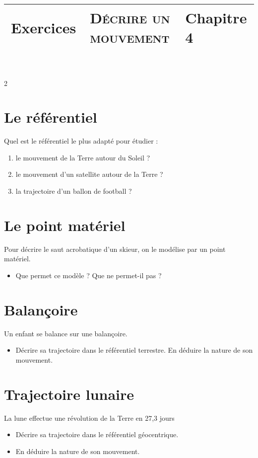 \documentclass[a4paper,11pt,fleqn]{article}%
\title{\vspace{-1cm}\large 
	\begin{tabular}{|>{\centering}m{5cm}|>{\centering}m{8cm}|>{\centering\arraybackslash}m{4cm}|}
		\hline
		Exercices & \textbf{\textsc{Décrire un mouvement}} &  Chapitre 4 \\
		\hline
\end{tabular}}
\date{}
\begin{document}
\maketitle
\vspace{-2.5cm}
\begin{multicols}{2}

\section{Le référentiel}
Quel est le référentiel le plus adapté pour étudier :
\begin{enumerate}
	\item le mouvement de la Terre autour du Soleil ?
	\item le mouvement d'un satellite autour de la Terre ?
	\item la trajectoire d'un ballon de football ?
\end{enumerate}

\section{Le point matériel}
Pour décrire le saut acrobatique d'un skieur, on le modélise par un point matériel.
\begin{itemize}
	\item Que permet ce modèle ? Que ne permet-il pas ?
\end{itemize}

\section{Balançoire}
Un enfant se balance sur une balançoire.
\begin{itemize}
	\item Décrire sa trajectoire dans le référentiel terrestre. En déduire la nature de son mouvement.
\end{itemize}

\section{Trajectoire lunaire}
La lune effectue une révolution de la Terre en 27,3 jours
\begin{itemize}
	\item Décrire sa trajectoire dans le référentiel géocentrique.
	\item En déduire la nature de son mouvement.
\end{itemize}


\end{multicols}
\end{document}
